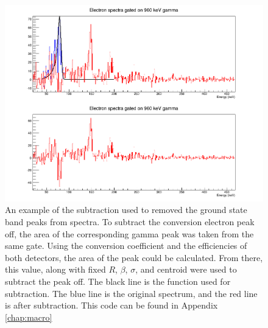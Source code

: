 \begin{figure}
    \centering
    \includegraphics[scale=0.4]{Analysis_Figs/Subtraction_SiLiAll_960.png}
    \caption{An example of the subtraction used to removed the ground state band peaks from spectra. To subtract the conversion electron peak off, the area of the corresponding gamma peak was taken from the same gate. Using the conversion coefficient and the efficiencies of both detectors, the area of the peak could be calculated. From there, this value, along with fixed $R$, $\beta$, $\sigma$, and centroid were used to subtract the peak off. The black line is the function used for subtraction. The blue line is the original spectrum, and the red line is after subtraction. This code can be found in Appendix \ref{chap:macro}}
    \label{fig:subtraction}
\end{figure}